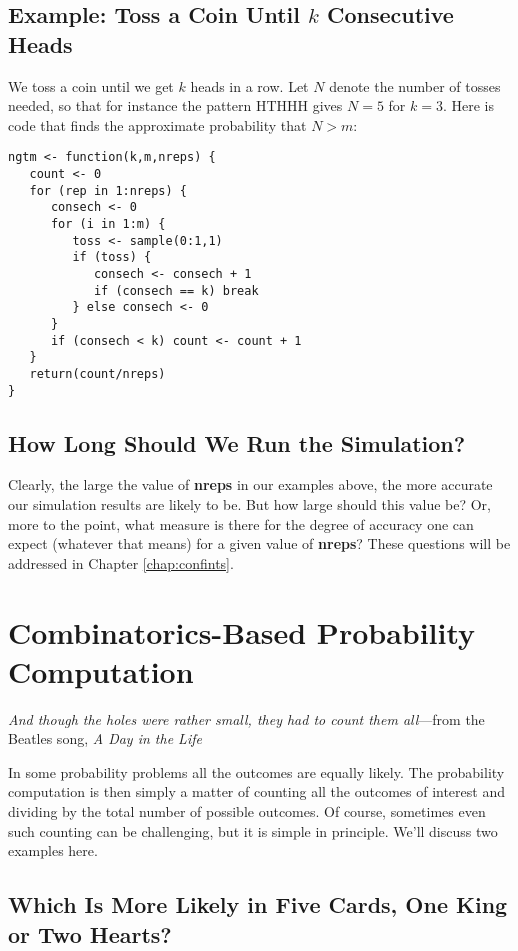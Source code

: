 \subsection{Example: Toss a Coin Until $k$ Consecutive Heads}

We toss a coin until we get $k$ heads in a row.  Let $N$ denote the
number of tosses needed, so that for instance the pattern HTHHH gives $N
= 5$ for $k = 3$.  Here is code that finds the approximate probability
that $N > m$:

\begin{lstlisting}
ngtm <- function(k,m,nreps) {
   count <- 0
   for (rep in 1:nreps) {
      consech <- 0
      for (i in 1:m) {
         toss <- sample(0:1,1)
         if (toss) {
            consech <- consech + 1
            if (consech == k) break
         } else consech <- 0
      }
      if (consech < k) count <- count + 1
   }
   return(count/nreps)
}
\end{lstlisting}

\subsection{How Long Should We Run the Simulation?}

Clearly, the large the value of {\bf nreps} in our examples above, the
more accurate our simulation results are likely to be.  But how large
should this value be?  Or, more to the point, what measure is there for
the degree of accuracy one can expect (whatever that means) for a given
value of {\bf nreps}?  These questions will be addressed in Chapter
\ref{chap:confints}.

\section{Combinatorics-Based Probability Computation}
\label{comb}

{\it And though the holes were rather small, they had to count them
all}---from the Beatles song, {\it A Day in the Life}

\bigskip

In some probability problems all the outcomes are equally likely.  The
probability computation is then simply a matter of counting all the
outcomes of interest and dividing by the total number of possible
outcomes.  Of course, sometimes even such counting can be challenging,
but it is simple in principle.  We'll discuss two examples here.

\subsection{Which Is More Likely in Five Cards, One King or Two
Hearts?}
\label{hearts}

